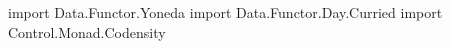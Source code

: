 \begin{code}
import Data.Functor.Yoneda
import Data.Functor.Day.Curried
import Control.Monad.Codensity
\end{code}
